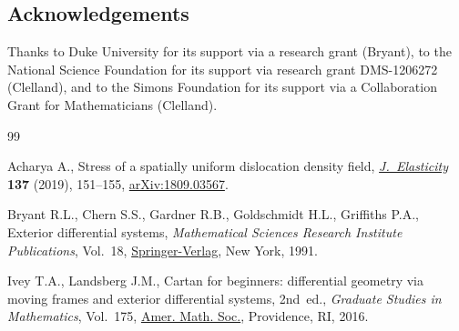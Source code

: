 \documentclass[pdftex]{sigma}
\numberwithin{equation}{section}
\begin{document}
\subsection*{Acknowledgements}
Thanks to Duke University for its support via a research grant (Bryant), to the National Science Foundation for its support via research grant DMS-1206272 (Clelland), and to the Simons Foundation for its support via a Collaboration Grant for Mathematicians (Clelland).

\begin{thebibliography}{99}
\footnotesize\itemsep=0pt

Acharya A., Stress of a spatially uniform dislocation density field,
 \href{https://doi.org/10.1007/s10659-018-09717-5}{\textit{J.~Elasticity}} \textbf{137} (2019), 151--155, \href{https://arxiv.org/abs/1809.03567}{arXiv:1809.03567}.

Bryant R.L., Chern S.S., Gardner R.B., Goldschmidt H.L., Griffiths P.A.,
 Exterior differential systems, \textit{Mathematical Sciences Research
 Institute Publications}, Vol.~18, \href{https://doi.org/10.1007/978-1-4613-9714-4}{Springer-Verlag}, New York, 1991.

Ivey T.A., Landsberg J.M., Cartan for beginners: differential geometry via
 moving frames and exterior differential systems, 2nd~ed., \textit{Graduate Studies in
 Mathematics}, Vol.~175, \href{https://doi.org/10.1090/gsm/175}{Amer. Math. Soc.}, Providence, RI, 2016.

\end{thebibliography}\LastPageEnding
\end{document}
